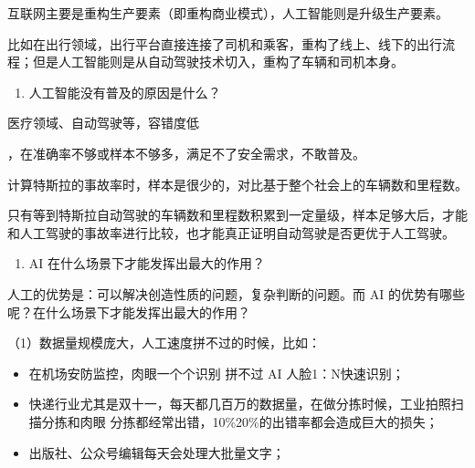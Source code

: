 \documentclass[letterpaper,11pt,english]{sphinxmanual}
\begin{document}
互联网主要是重构生产要素（即重构商业模式），人工智能则是升级生产要素。

比如在出行领域，出行平台直接连接了司机和乘客，重构了线上、线下的出行流程；但是人工智能则是从自动驾驶技术切入，重构了车辆和司机本身。
\begin{enumerate}
%
\setcounter{enumi}{1}
\item {} 
人工智能没有普及的原因是什么？

\end{enumerate}

医疗领域、自动驾驶等，容错度低%
\begin{footnote}[70]\sphinxAtStartFootnote
{}
%
\end{footnote}，在准确率不够或样本不够多，满足不了安全需求，不敢普及。

计算特斯拉的事故率时，样本是很少的，对比基于整个社会上的车辆数和里程数。

只有等到特斯拉自动驾驶的车辆数和里程数积累到一定量级，样本足够大后，才能和人工驾驶的事故率进行比较，也才能真正证明自动驾驶是否更优于人工驾驶。
\begin{enumerate}
%
\setcounter{enumi}{2}
\item {} 
AI
在什么场景下才能发挥出最大的作用？%
\begin{footnote}[71]\sphinxAtStartFootnote
{}
%
\end{footnote}

\end{enumerate}

人工的优势是：可以解决创造性质的问题，复杂判断的问题。而 AI
的优势有哪些呢？在什么场景下才能发挥出最大的作用？

（1）数据量规模庞大，人工速度拼不过的时候，比如：
\begin{itemize}
\item {} 
在机场安防监控，肉眼一个个识别 拼不过 AI 人脸1：N快速识别；

\item {} 
快递行业尤其是双十一，每天都几百万的数据量，在做分拣时候，工业拍照扫描分拣和肉眼\sphinxhyphen{}
分拣都经常出错，10\%\sphinxhyphen{}20\%的出错率都会造成巨大的损失；

\item {} 
出版社、公众号编辑每天会处理大批量文字；

\end{itemize}
\end{document}
